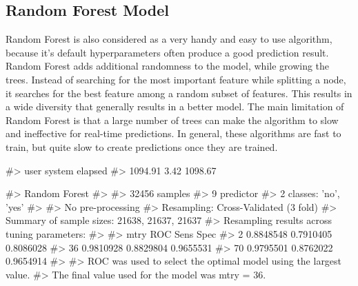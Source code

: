 \hypertarget{random-forest-model}{%
\subsection{Random Forest Model}\label{random-forest-model}}

Random Forest is also considered as a very handy and easy to use
algorithm, because it's default hyperparameters often produce a good
prediction result. Random Forest adds additional randomness to the
model, while growing the trees. Instead of searching for the most
important feature while splitting a node, it searches for the best
feature among a random subset of features. This results in a wide
diversity that generally results in a better model. The main limitation
of Random Forest is that a large number of trees can make the algorithm
to slow and ineffective for real-time predictions. In general, these
algorithms are fast to train, but quite slow to create predictions once
they are trained.

\begin{Schunk}
\begin{Soutput}
#>    user  system elapsed 
#> 1094.91    3.42 1098.67
\end{Soutput}
\begin{Soutput}
#> Random Forest 
#> 
#> 32456 samples
#>     9 predictor
#>     2 classes: 'no', 'yes' 
#> 
#> No pre-processing
#> Resampling: Cross-Validated (3 fold) 
#> Summary of sample sizes: 21638, 21637, 21637 
#> Resampling results across tuning parameters:
#> 
#>   mtry  ROC        Sens       Spec     
#>    2    0.8848548  0.7910405  0.8086028
#>   36    0.9810928  0.8829804  0.9655531
#>   70    0.9795501  0.8762022  0.9654914
#> 
#> ROC was used to select the optimal model using the largest value.
#> The final value used for the model was mtry = 36.
\end{Soutput}
\end{Schunk}

